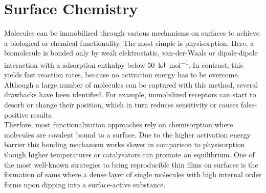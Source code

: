 \subsection{}
\clearpage
\section{Surface Chemistry}
Molecules can be immobilized through various mechanisms on surfaces to achieve a biological or chemical functionality. The most simple is physisorption. Here, a biomolecule is bonded only by weak elektrostatic, van-der-Waals or dipole-dipole interaction with a adsorption enthalpy below \SI{50}{\kilo\joule\per\mole}. In contrast, this yields fast reaction rates, because no activation energy has to be overcome. Although a large number of molecules can be captured with this method, several drawbacks have been identified. \cite{lit:bio:ImmobilizationTechniques, lit:bio:immobilization:UV-ABs}
For example, immobilized receptors can start to desorb or change their position, which in turn reduces sensitivity or causes false-positive results. \cite{lit:bio:physisorp:desorption, lit:chem:surfModOptics} \\
Therfore, most functionalization approaches rely on chemisorption where molecules are covalent bound to a surface. Due to the higher activation energy barrier this bonding mechanism works slower in comparison to physisorption though higher temperatures or catalysators can promote an equilibrium. One of the most well-known strategies to bring reproducible thin films on surfaces is the formation of \glspl{sam} where a dense layer of single molecules with high internal order forms upon dipping into a surface-active substance. \cite{lit:chem:sin:langeDiss}

